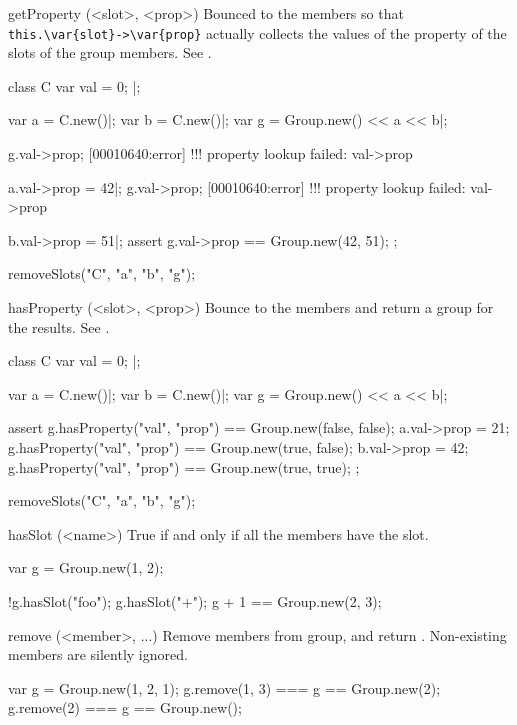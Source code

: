 \begin{urbiscriptapi}
\item[getProperty](<slot>, <prop>)%
  Bounced to the members so that \lstinline|this.\var{slot}->\var{prop}|
  actually collects the values of the property  of the slots
   of the group members.  See .
\begin{urbiscript}
class C
{
  var val = 0;
}|;

var a = C.new()|; var b = C.new()|;
var g = Group.new() << a << b|;

g.val->prop;
[00010640:error] !!! property lookup failed: val->prop

a.val->prop = 42|;
g.val->prop;
[00010640:error] !!! property lookup failed: val->prop

b.val->prop = 51|;
assert
{
  g.val->prop == Group.new(42, 51);
};
\end{urbiscript}
\begin{urbicomment}
  removeSlots("C", "a", "b", "g");
\end{urbicomment}


\item[hasProperty](<slot>, <prop>)%
  Bounce to the members and return a group for the results.  See
  .
\begin{urbiscript}
class C
{
  var val = 0;
}|;

var a = C.new()|; var b = C.new()|;
var g = Group.new() << a << b|;

assert
{
  g.hasProperty("val", "prop") == Group.new(false, false);
  a.val->prop = 21;
  g.hasProperty("val", "prop") == Group.new(true, false);
  b.val->prop = 42;
  g.hasProperty("val", "prop") == Group.new(true, true);
};
\end{urbiscript}
\begin{urbicomment}
  removeSlots("C", "a", "b", "g");
\end{urbicomment}


\item[hasSlot](<name>)%
  True if and only if all the members have the slot.

\begin{urbiassert}
var g = Group.new(1, 2);

!g.hasSlot("foo");
 g.hasSlot("+");
 g + 1 == Group.new(2, 3);
\end{urbiassert}


\item[remove](<member>, ...)%
  Remove members from \this group, and return \this.  Non-existing members
  are silently ignored.
\begin{urbiassert}
var g = Group.new(1, 2, 1);
g.remove(1, 3) === g == Group.new(2);
g.remove(2)    === g == Group.new();
\end{urbiassert}



\end{urbiscriptapi}
